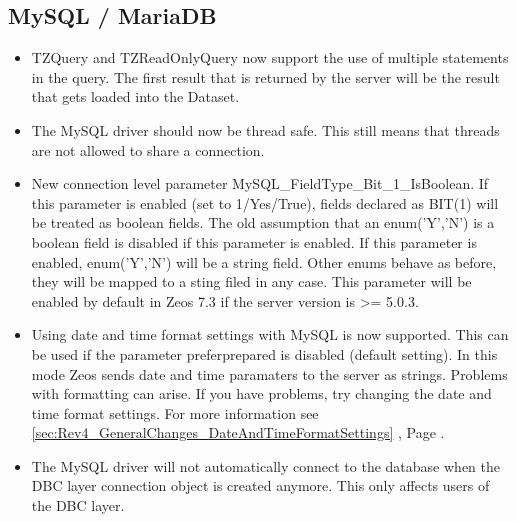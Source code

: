 \documentclass[a4paper,12pt,oneside]{book}
\begin{document}
\subsection{MySQL / MariaDB}
\label{sec:Rev4_DriverSpecificChanges_MysqlMariadb}
\begin{itemize}
\item
  TZQuery and TZReadOnlyQuery now support the use of multiple statements in the query.
	The first result that is returned by the server will be the result that gets loaded into the Dataset.
\item
  The MySQL driver should now be thread safe.
	This still means that threads are not allowed to share a connection.
\item
  New connection level parameter MySQL\_FieldType\_Bit\_1\_IsBoolean.
	If this parameter is enabled (set to 1/Yes/True), fields declared as BIT(1) will be treated as boolean fields.
	The old assumption that an enum('Y','N') is a boolean field is disabled if this parameter is enabled.
	If this parameter is enabled, enum('Y','N') will be a string field.
	Other enums behave as before, they will be mapped to a sting filed in any case.
	This parameter will be enabled by default in Zeos 7.3 if the server version is \textgreater= 5.0.3.
\item
  Using date and time format settings with MySQL is now supported.
	This can be used if the parameter preferprepared is disabled (default setting).
  In this mode Zeos sends date and time paramaters to the server as strings.
	Problems with formatting can arise.
	If you have problems, try changing the date and time format settings.
	For more information see \ref{sec:Rev4_GeneralChanges_DateAndTimeFormatSettings} , Page \pageref{sec:Rev4_GeneralChanges_DateAndTimeFormatSettings}.
\item
  The MySQL driver will not automatically connect to the database when the DBC layer connection object is created anymore.
	This only affects users of the DBC layer.
\end{itemize}
\end{document}
